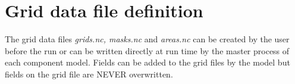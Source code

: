 \begin{itemize}

\end{itemize}

\section{Grid data file definition}
\label{subsubsec_griddef}

The grid data files {\em grids.nc, masks.nc} and {\em areas.nc} can be
created by the user before the run or can be written directly at run
time by the master process of each component model.  Fields can be
added to the grid files by the model but fields on the grid file
are NEVER overwritten.



